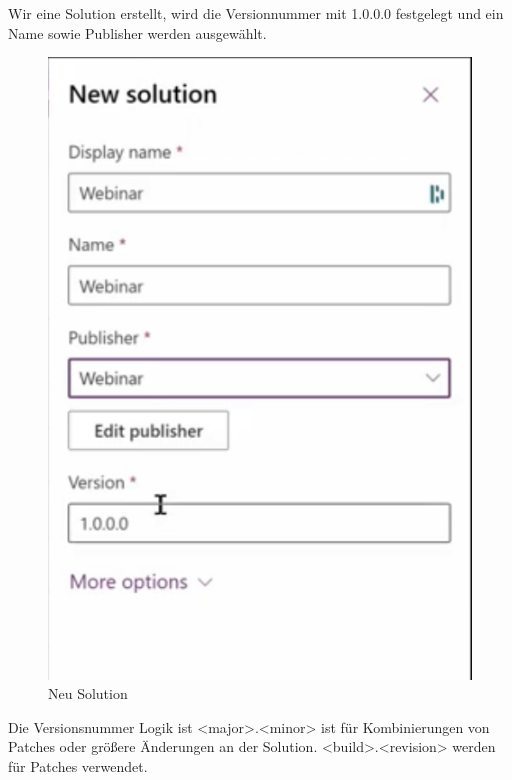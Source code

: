 Wir eine Solution erstellt, wird die Versionnummer mit 1.0.0.0 festgelegt und ein Name sowie Publisher werden ausgewählt.
\begin{figure}[H]
	\centering
	\includegraphics[scale = 0.3]{attachment/chapter_13/Scc030}
	\caption{Neu Solution} 
\end{figure}

Die Versionsnummer Logik ist <major>.<minor> ist für Kombinierungen von Patches oder größere Änderungen an der Solution. <build>.<revision> werden für Patches verwendet.


